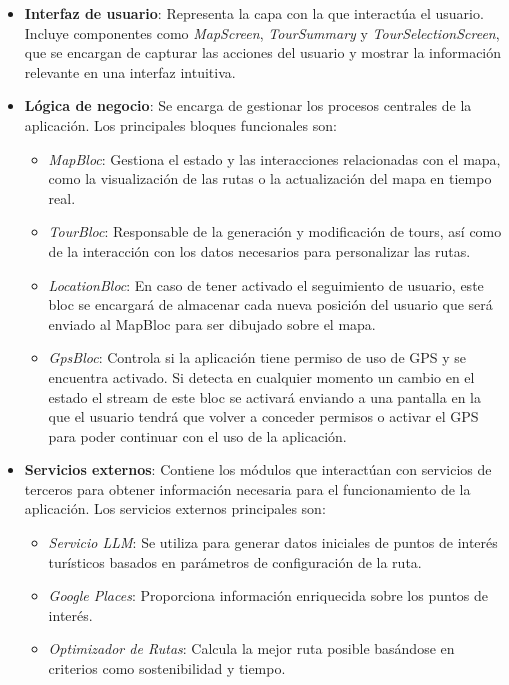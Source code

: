 \begin{itemize}
	\item \textbf{Interfaz de usuario}: Representa la capa con la que interactúa el usuario. Incluye componentes como \textit{MapScreen}, \textit{TourSummary} y \textit{TourSelectionScreen}, que se encargan de capturar las acciones del usuario y mostrar la información relevante en una interfaz intuitiva.
	
	\item \textbf{Lógica de negocio}: Se encarga de gestionar los procesos centrales de la aplicación. Los principales bloques funcionales son:
	\begin{itemize}
		\item \textit{MapBloc}: Gestiona el estado y las interacciones relacionadas con el mapa, como la visualización de las rutas o la actualización del mapa en tiempo real.
		\item \textit{TourBloc}: Responsable de la generación y modificación de tours, así como de la interacción con los datos necesarios para personalizar las rutas.
		\item \textit{LocationBloc}: En caso de tener activado el seguimiento de usuario, este bloc se encargará de almacenar cada nueva posición del usuario que será enviado al MapBloc para ser dibujado sobre el mapa.
		\item \textit{GpsBloc}: Controla si la aplicación tiene permiso de uso de GPS y se encuentra activado. Si detecta en cualquier momento un cambio en el estado el stream de este bloc se activará enviando a una pantalla en la que el usuario tendrá que volver a conceder permisos o activar el GPS para poder continuar con el uso de la aplicación.
	\end{itemize}
	
	\item \textbf{Servicios externos}: Contiene los módulos que interactúan con servicios de terceros para obtener información necesaria para el funcionamiento de la aplicación. Los servicios externos principales son:
	\begin{itemize}
		\item \textit{Servicio LLM}: Se utiliza para generar datos iniciales de puntos de interés turísticos basados en parámetros de configuración de la ruta.
		\item \textit{Google Places}: Proporciona información enriquecida sobre los puntos de interés.
		\item \textit{Optimizador de Rutas}: Calcula la mejor ruta posible basándose en criterios como sostenibilidad y tiempo.
	\end{itemize}
\end{itemize}


